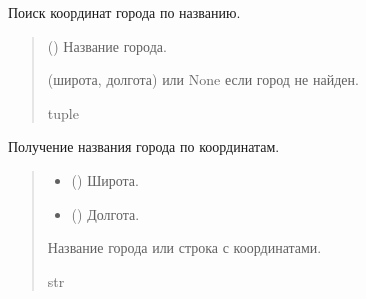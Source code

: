\documentclass[letterpaper,10pt,russian]{sphinxmanual}
\begin{document}
\begin{fulllineitems}
\label{\detokenize{Project_weather:app.weather.controller.find_city_coordinates}}
\pysigstartsignatures
\pysiglinewithargsret
{}
{}
{}
\pysigstopsignatures
\sphinxAtStartPar
Поиск координат города по названию.
\begin{quote}\begin{description}
\sphinxAtStartPar
{} () \textendash{} Название города.

\sphinxAtStartPar
(широта, долгота) или None если город не найден.

\sphinxAtStartPar
tuple

\end{description}\end{quote}

\end{fulllineitems}


\begin{fulllineitems}
\label{\detokenize{Project_weather:app.weather.controller.get_city_name}}
\pysigstartsignatures
\pysiglinewithargsret
{}
{\sphinxparamcomma {}}
{}
\pysigstopsignatures
\sphinxAtStartPar
Получение названия города по координатам.
\begin{quote}\begin{description}
\begin{itemize}
\item {} 
\sphinxAtStartPar
{} () \textendash{} Широта.

\item {} 
\sphinxAtStartPar
{} () \textendash{} Долгота.

\end{itemize}

\sphinxAtStartPar
Название города или строка с координатами.

\sphinxAtStartPar
str

\end{description}\end{quote}

\end{fulllineitems}
\end{document}
